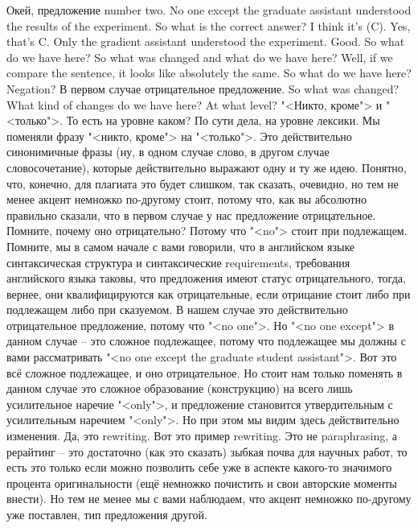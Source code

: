 \documentclass[main.tex]{subfiles}
\begin{document}
Окей, предложение number two.
No one except the graduate assistant understood the results of the experiment.
So what is the correct answer? I think it's (C).
Yes, that's C.
Only the gradient assistant understood the experiment.
Good.
So what do we have here?
So what was changed and what do we have here?
Well, if we compare the sentence, it looks like absolutely the same.
So what do we have here?
Negation?
В первом случае отрицательное предложение.
So what was changed?
What kind of changes do we have here?
At what level?
"<Никто, кроме"> и "<только">.
То есть на уровне каком?
По сути дела, на уровне лексики.
Мы поменяли фразу "<никто, кроме"> на "<только">.
Это действительно синонимичные фразы (ну, в одном случае слово, в другом случае словосочетание), которые действительно выражают одну и ту же идею.
Понятно, что, конечно, для плагиата это будет слишком, так сказать, очевидно, но тем не менее акцент немножко по-другому стоит, потому что, как вы абсолютно правильно сказали, что в первом случае у нас предложение отрицательное.
Помните, почему оно отрицательно?
Потому что "<no"> стоит при подлежащем.
Помните, мы в самом начале с вами говорили, что в английском языке синтаксическая структура и синтаксические requirements, требования английского языка таковы, что предложения имеют статус отрицательного, тогда, вернее, они квалифицируются как отрицательные, если отрицание стоит либо при подлежащем либо при сказуемом.
В нашем случае это действительно отрицательное предложение, потому что "<no one">.
Но "<no one except"> в данном случае -- это сложное подлежащее, потому что подлежащее мы должны с вами рассматривать "<no one except the graduate student assistant">.
Вот это всё сложное подлежащее, и оно отрицательное.
Но стоит нам только поменять в данном случае это сложное образование (конструкцию) на всего лишь усилительное наречие "<only">, и предложение становится утвердительным с усилительным наречием "<only">.
Но при этом мы видим здесь действительно изменения.
Да, это rewriting.
Вот это пример rewriting.
Это не paraphrasing, а рерайтинг -- это достаточно (как это сказать) зыбкая почва для научных работ, то есть это только если можно позволить себе уже в аспекте какого-то значимого процента оригинальности (ещё немножко почистить и свои авторские моменты внести).
Но тем не менее мы с вами наблюдаем, что акцент немножко по-другому уже поставлен, тип предложения другой.
\end{document}
